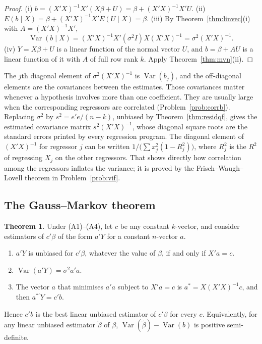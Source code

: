 \documentclass[11pt,a4paper]{article}
\numberwithin{equation}{section}
\DeclareMathOperator{\Var}{Var}
\theoremstyle{definition}
\newtheorem{thm}{Theorem}[subsection]
\begin{document}
\begin{proof}
(i) $b = (X'X)^{-1}X'(X\beta + U) = \beta + (X'X)^{-1}X'U$.
(ii) $E(b \mid X) = \beta + (X'X)^{-1}X'E(U \mid X) = \beta$.
(iii) By Theorem~\ref{thm:linvec}(i) with $A = (X'X)^{-1}X'$,
\[
\Var(b \mid X) = (X'X)^{-1}X'(\sigma^2I)X(X'X)^{-1} = \sigma^2(X'X)^{-1} .
\]
(iv) $Y = X\beta + U$ is a linear function of the normal vector $U$, and $b = \beta + AU$ is a linear function of it with $A$ of full row rank $k$.
Apply Theorem~\ref{thm:mvn}(ii).
\end{proof}

The $j$th diagonal element of $\sigma^2(X'X)^{-1}$ is $\Var(b_j)$, and the off-diagonal elements are the covariances between the estimates. Those
covariances matter whenever a hypothesis involves more than one coefficient. They are usually large when the corresponding regressors are
correlated (Problem~\ref{prob:corrb}). Replacing $\sigma^2$ by $s^2 = e'e/(n - k)$, unbiased by Theorem~\ref{thm:residqf}, gives the estimated
covariance matrix $s^2(X'X)^{-1}$, whose diagonal square roots are the standard errors printed by every regression program. The diagonal element of
$(X'X)^{-1}$ for regressor $j$ can be written $1/\bigl(\sum x_j^2(1 - R_j^2)\bigr)$, where $R_j^2$ is the $R^2$ of regressing $X_j$ on the other regressors.
That shows directly how correlation among the regressors inflates the variance; it is proved by the Frisch--Waugh--Lovell theorem in
Problem~\ref{prob:vif}.

\subsection{The Gauss--Markov theorem}
\label{ssec:gmk}

\begin{thm}
\label{thm:gmk}
Under (A1)--(A4), let $c$ be any constant $k$-vector, and consider estimators of $c'\beta$ of the form $a'Y$ for a constant $n$-vector $a$.
\begin{enumerate}[label=(\roman*)]
\item $a'Y$ is unbiased for $c'\beta$, whatever the value of $\beta$, if and only if $X'a = c$.
\item $\Var(a'Y) = \sigma^2a'a$.
\item The vector $a$ that minimises $a'a$ subject to $X'a = c$ is $a^* = X(X'X)^{-1}c$, and then $a^{*\prime}Y = c'b$.
\end{enumerate}
Hence $c'b$ is the best linear unbiased estimator of $c'\beta$ for every $c$. Equivalently, for any linear unbiased estimator $\tilde\beta$ of $\beta$,
$\Var(\tilde\beta) - \Var(b)$ is positive semi-definite.
\end{thm}
\end{document}
